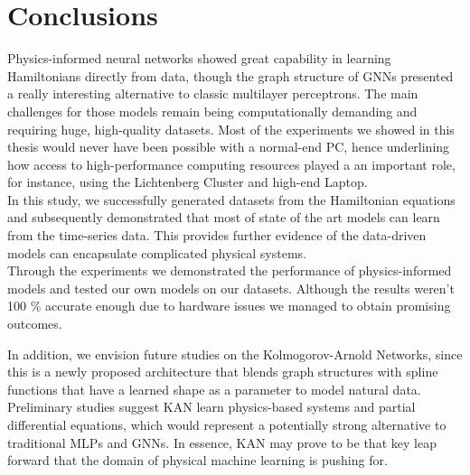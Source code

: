 \chapter{Conclusions}
Physics-informed neural networks showed great capability in learning Hamiltonians directly from data, though the graph structure of GNNs presented a really interesting alternative to classic multilayer perceptrons. The main challenges for those models remain being computationally demanding and requiring huge, high-quality datasets. Most of the experiments we showed in this thesis would never have been possible with a normal-end PC, hence underlining how access to high-performance computing resources played a an important role, for instance, using the Lichtenberg Cluster and high-end Laptop.\\
In this study, we successfully generated datasets from the Hamiltonian equations and subsequently demonstrated that most of state of the art models  can learn from the time-series data. This provides further evidence of the  data-driven models can encapsulate complicated physical systems.\\
Through the experiments we demonstrated the performance of physics-informed models and  tested our own models on our datasets. Although the results weren't 100 \% accurate enough due to hardware issues we managed to obtain promising outcomes.  

In addition, we envision future studies on the Kolmogorov-Arnold Networks, since this is a newly proposed architecture that blends graph structures with spline functions that have a learned shape as a parameter to model natural data. Preliminary studies suggest KAN learn physics-based systems and partial differential equations, which would represent a potentially strong alternative to traditional MLPs and GNNs\cite{kan}. In essence, KAN may prove to be that key leap forward that the domain of physical machine learning is pushing for.
   